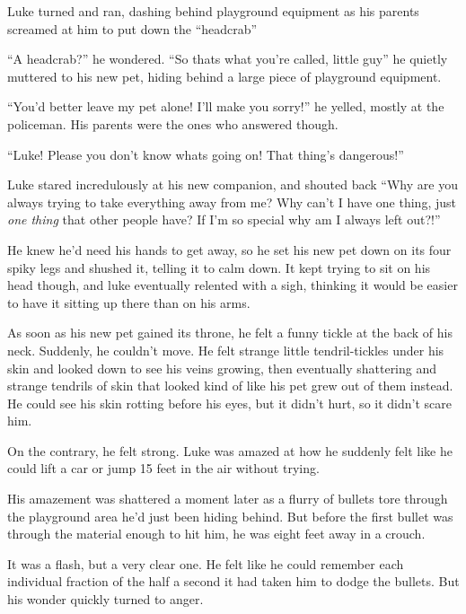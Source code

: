 Luke turned and ran, dashing behind playground equipment as his
parents screamed at him to put down the ``headcrab''



``A headcrab?'' he wondered. ``So thats what you're called, little
guy'' he quietly muttered to his new pet, hiding behind a large
piece of playground equipment.



``You'd better leave my pet alone! I'll make you sorry!'' he yelled,
mostly at the policeman. His parents were the ones who answered
though.



``Luke! Please you don't know whats going on! That thing's
dangerous!''



Luke stared incredulously at his new companion, and shouted back ``Why
are you always trying to take everything away from me? Why can't I have
one thing, just {\em one thing} that other people have? If I'm so
special why am I always left out?!''



He knew he'd need his hands to get away, so he set his new pet down
on its four spiky legs and shushed it, telling it to calm down. It
kept trying to sit on his head though, and luke eventually relented
with a sigh, thinking it would be easier to have it sitting up
there than on his arms.



As soon as his new pet gained its throne, he felt a funny tickle at
the back of his neck. Suddenly, he couldn't move. He felt strange
little tendril-tickles under his skin and looked down to see his
veins growing, then eventually shattering and strange tendrils of
skin that looked kind of like his pet grew out of them instead. He
could see his skin rotting before his eyes, but it didn't hurt, so
it didn't scare him.



On the contrary, he felt strong. Luke was amazed at how he suddenly
felt like he could lift a car or jump 15 feet in the air without
trying.



His amazement was shattered a moment later as a flurry of bullets
tore through the playground area he'd just been hiding behind. But
before the first bullet was through the material enough to hit him,
he was eight feet away in a crouch.



It was a flash, but a very clear one. He felt like he could
remember each individual fraction of the half a second it had taken
him to dodge the bullets. But his wonder quickly turned to
anger.



